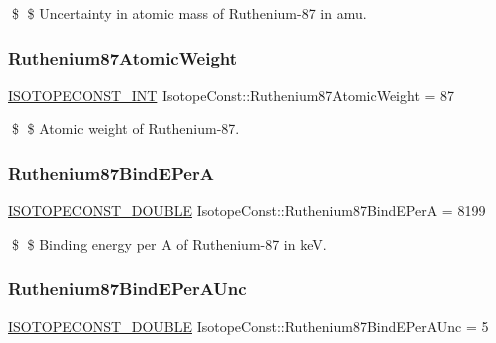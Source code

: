 \$ \$ Uncertainty in atomic mass of Ruthenium-\/87 in amu. \mbox{\label{group___isotope_const-_ruthenium-_ru87_ga8ae57cbdb18f42a3463b75e4c5e5cc97}} 
\subsubsection{\texorpdfstring{Ruthenium87\+Atomic\+Weight}{Ruthenium87AtomicWeight}}
{\footnotesize\ttfamily \mbox{\hyperlink{group___isotope_const-_macros_ga5f18360b3e99483a35c32d789e62621c}{I\+S\+O\+T\+O\+P\+E\+C\+O\+N\+S\+T\+\_\+\+I\+NT}} Isotope\+Const\+::\+Ruthenium87\+Atomic\+Weight = 87}

\$ \$ Atomic weight of Ruthenium-\/87. \mbox{\label{group___isotope_const-_ruthenium-_ru87_gaf6683a6ea94494869b176bf05aabb4bb}} 
\subsubsection{\texorpdfstring{Ruthenium87\+Bind\+E\+PerA}{Ruthenium87BindEPerA}}
{\footnotesize\ttfamily \mbox{\hyperlink{group___isotope_const-_macros_ga8f45a7272ce02c0b4c65c44636ed719a}{I\+S\+O\+T\+O\+P\+E\+C\+O\+N\+S\+T\+\_\+\+D\+O\+U\+B\+LE}} Isotope\+Const\+::\+Ruthenium87\+Bind\+E\+PerA = 8199}

\$ \$ Binding energy per A of Ruthenium-\/87 in keV. \mbox{\label{group___isotope_const-_ruthenium-_ru87_gabb9eb11acbf8d5e42ada919f57b6f533}} 
\subsubsection{\texorpdfstring{Ruthenium87\+Bind\+E\+Per\+A\+Unc}{Ruthenium87BindEPerAUnc}}
{\footnotesize\ttfamily \mbox{\hyperlink{group___isotope_const-_macros_ga8f45a7272ce02c0b4c65c44636ed719a}{I\+S\+O\+T\+O\+P\+E\+C\+O\+N\+S\+T\+\_\+\+D\+O\+U\+B\+LE}} Isotope\+Const\+::\+Ruthenium87\+Bind\+E\+Per\+A\+Unc = 5}

